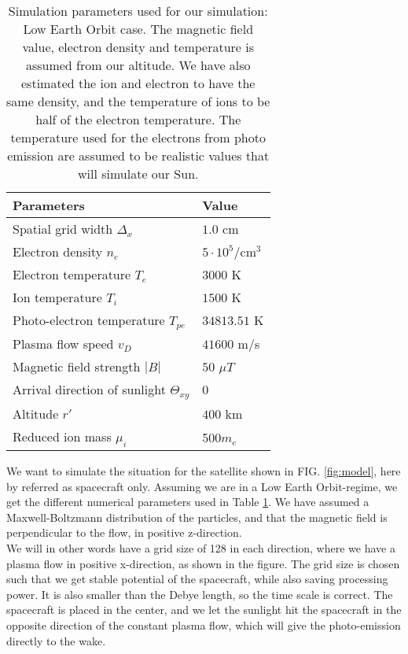 \documentclass[aip, 
rsi, 
amsmath,
amssymb,
longbibliography,
reprint]{revtex4-1}
\begin{document}
\begin{table}
  \centering
  \caption{Simulation parameters used for our simulation: Low Earth Orbit case. The magnetic field value, electron density and temperature is assumed from our altitude. We have also estimated the ion and electron to have the same density, and the temperature of ions to be half of the electron temperature. The temperature used for the electrons from photo emission are assumed to be realistic values that will simulate our Sun.\label{tab:table1}}
\begin{tabular}{|l|l|}
\hline
\hline
  Parameters & Value  \\
  \hline
   Spatial grid width \(\Delta_x\) & \(1.0\) cm \\
   Electron density \(n_e\) & \(5 \cdot 10^5\)/cm$^3$   \\
   Electron temperature \(T_e\) & \(3000\) K   \\
   Ion temperature \(T_i\) & \(1500\) K \\
   Photo-electron temperature \(T_{pe}\) & \(34813.51\) K  \\
   Plasma flow speed \(v_D\)  & \(41600\) m/s  \\
   Magnetic field strength \(|B|\) & \(50 \)  \(\mu T\) \\
   Arrival direction of sunlight \(\Theta_{xy}\) & \(0\)\\
   Altitude \(r'\) & \(400\) km \\
   Reduced ion mass $\mu_i$ & 500$m_e$ \\
   \hline
\hline
\end{tabular}
\end{table}

We want to simulate the situation for the satellite shown in FIG. \ref{fig:model}, here by referred as spacecraft only. Assuming we are in a Low Earth Orbit-regime, we get the different numerical parameters used in Table \ref{tab:table1}. We have  assumed a Maxwell-Boltzmann distribution of the particles, and that the magnetic field is perpendicular to the flow, in positive z-direction.\\

 We will in other words have a grid size of 128 in each direction, where we have a plasma flow in positive x-direction, as shown in the figure. The grid size is chosen such that we get stable potential of the spacecraft, while also saving processing power. It is also smaller than the Debye length, so the time scale is correct. The spacecraft is placed in the center, and we let the sunlight hit the spacecraft in the opposite direction of the constant plasma flow, which will give the photo-emission directly to the wake.\\
 
\end{document}
